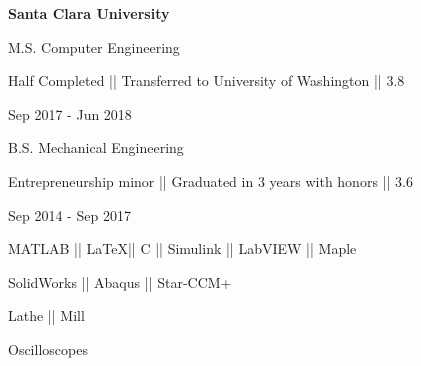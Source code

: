\vspace{7.4ex}
{\hspace{-1.72in}\textbf{Santa Clara University}}{}{}

\vspace{-2.5ex}

{{\small M.S. Computer Engineering }}
\begin{detail}
\BulletItem
Half Completed || Transferred to University of Washington || 3.8
\end{detail}

\begin{subtitle}
\vspace{-8ex}
{{Sep 2017 - Jun 2018}}
\end{subtitle}

\vspace{1ex}

{{\small B.S. Mechanical Engineering}}
\begin{detail}
\BulletItem
Entrepreneurship minor || Graduated in 3 years with honors || 3.6
\end{detail}

\begin{subtitle}
\vspace{-8ex}
{{Sep 2014 - Sep 2017}}
\end{subtitle}

{
\vspace{1.5ex}
\color{cyan}\small
{MATLAB || \LaTeX || C || Simulink || LabVIEW || Maple} %
}

{
\vspace{-2.5ex}\hspace{3.17in}
\color{cyan}\small
{SolidWorks || Abaqus || Star-CCM+} %
}

{
\vspace{-0.5ex}
\color{cyan}\small
{Lathe || Mill} %
}

{
\vspace{-2.5ex}\hspace{3.17in}
\color{cyan}\small
{Oscilloscopes} %
}

